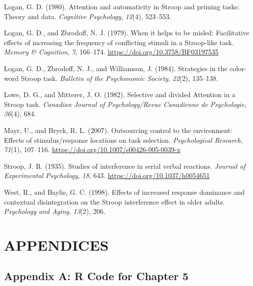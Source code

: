 \documentclass[]{DissertateCUNY}
\begin{document}
\leavevmode\hypertarget{ref-logan_attention_1980}{}%
Logan, G. D. (1980). Attention and automaticity in Stroop and priming
tasks: Theory and data. \emph{Cognitive Psychology}, \emph{12}(4),
523--553.

\leavevmode\hypertarget{ref-logan_when_1979}{}%
Logan, G. D., and Zbrodoff, N. J. (1979). When it helps to be misled:
Facilitative effects of increasing the frequency of conflicting stimuli
in a Stroop-like task. \emph{Memory \& Cognition}, \emph{7}, 166--174.
\url{https://doi.org/10.3758/BF03197535}

\leavevmode\hypertarget{ref-logan_strategies_1984}{}%
Logan, G. D., Zbrodoff, N. J., and Williamson, J. (1984). Strategies in
the color-word Stroop task. \emph{Bulletin of the Psychonomic Society},
\emph{22}(2), 135--138.

\leavevmode\hypertarget{ref-lowe_selective_1982}{}%
Lowe, D. G., and Mitterer, J. O. (1982). Selective and divided Attention
in a Stroop task. \emph{Canadian Journal of Psychology/Revue Canadienne
de Psychologie}, \emph{36}(4), 684.

\leavevmode\hypertarget{ref-mayr_outsourcing_2007}{}%
Mayr, U., and Bryck, R. L. (2007). Outsourcing control to the
environment: Effects of stimulus/response locations on task selection.
\emph{Psychological Research}, \emph{71}(1), 107--116.
\url{https://doi.org/10.1007/s00426-005-0039-x}

\leavevmode\hypertarget{ref-stroop_studies_1935}{}%
Stroop, J. R. (1935). Studies of interference in serial verbal
reactions. \emph{Journal of Experimental Psychology}, \emph{18}, 643.
\url{https://doi.org/10.1037/h0054651}

\leavevmode\hypertarget{ref-west_effects_1998}{}%
West, R., and Baylis, G. C. (1998). Effects of increased response
dominance and contextual disintegration on the Stroop interference
effect in older adults. \emph{Psychology and Aging}, \emph{13}(2), 206.

\clearpage

\fancyhead[R]{\thepage}
\fancyfoot[C]{}
\chapter*{APPENDICES}

\doublespacing

\hypertarget{appendix-a-r-code-for-chapter-5}{%
\section*{Appendix A: R Code for Chapter
5}\label{appendix-a-r-code-for-chapter-5}}
\end{document}
